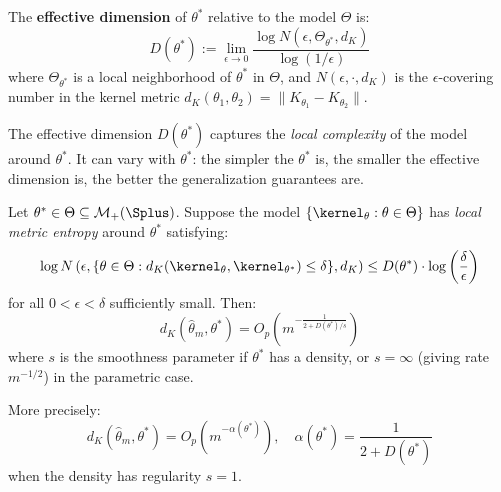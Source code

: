 \documentclass{article}
\begin{document}
\begin{definition}
	\label{def:eff-dim}
	The \textbf{effective dimension} of $\theta^*$ relative to the model $\Theta$ is:
	\begin{equation}
		D(\theta^*) := \lim_{\epsilon \to 0} \frac{\log N(\epsilon, \Theta_{\theta^*}, d_K)}{\log(1/\epsilon)}
	\end{equation}
	where $\Theta_{\theta^*}$ is a local neighborhood of $\theta^*$ in $\Theta$, and $N(\epsilon, \cdot, d_K)$ is the $\epsilon$-covering number in the kernel metric $d_K(\theta_1, \theta_2) = \|K_{\theta_1} - K_{\theta_2}\|$.
\end{definition}

\begin{remark}
	The effective dimension $D(\theta^*)$ captures the \emph{local complexity} of the model around $\theta^*$. It can vary with $\theta^*$: the simpler the $\theta^*$ is, the smaller the effective dimension is, the better the generalization guarantees are.
\end{remark}



\begin{theorem}
	\label{thm:theta-mle-rate}
	Let $\theta^* \in \Theta \subseteq \mathcal{M}_+(\Splus)$. Suppose the model $\{\kernel_\theta : \theta \in \Theta\}$ has \emph{local metric entropy} around $\theta^*$ satisfying:
	\begin{equation}
		\log N\left(\epsilon, \{\theta \in \Theta : d_K(\kernel_\theta, \kernel_{\theta^*}) \leq \delta\}, d_K\right) \leq D(\theta^*) \cdot \log\left(\frac{\delta}{\epsilon}\right)
	\end{equation}
	for all $0 < \epsilon < \delta$ sufficiently small. Then:
	\begin{equation}
		d_K(\hat{\theta}_m, \theta^*) = O_p\left(m^{-\frac{1}{2 + D(\theta^*)/s}}\right)
	\end{equation}
	where $s$ is the smoothness parameter if $\theta^*$ has a density, or $s = \infty$ (giving rate $m^{-1/2}$) in the parametric case.

	More precisely:
	\begin{equation}
		d_K(\hat{\theta}_m, \theta^*) = O_p\left(m^{-\alpha(\theta^*)}\right), \quad \alpha(\theta^*) = \frac{1}{2 + D(\theta^*)}
	\end{equation}
	when the density has regularity $s = 1$.
\end{theorem}
\end{document}
